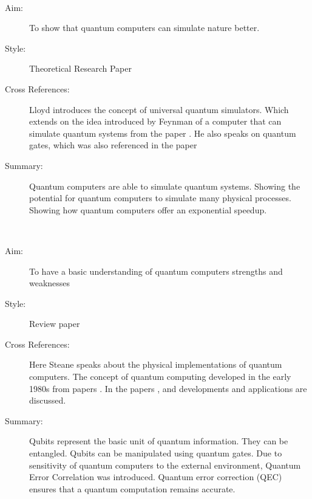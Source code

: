 \documentclass{Assignment}
\begin{document}
\newpage
\cite{UQS}~

\begin{description}
	\item[Aim:] 
	To show that quantum computers can simulate nature better.
	
	\item [Style:] Theoretical Research Paper
	
	\item [Cross References:]
	Lloyd introduces the concept of universal quantum simulators. 
	Which extends on the idea introduced by Feynman of a computer that can simulate quantum systems from the paper \cite{feynman1982simulating}. 
	He also speaks on quantum gates, which was also referenced in the paper \cite{Deutsch1989}
	
	\item[Summary:] 
	Quantum computers are able to simulate quantum systems. 
	Showing the potential for quantum computers to simulate many physical processes.	
	Showing how quantum computers offer an exponential speedup.

	
	
\end{description}
\newpage
\cite{AndrewSteane}~
\begin{description}
	\item[Aim:] 
	To have a basic understanding of quantum computers strengths and weaknesses
	
	\item [Style:] 
	Review paper
	
	\item [Cross References:] 
	Here Steane speaks about the physical implementations of quantum computers. 
	The concept of quantum computing developed in the early 1980s from papers \cite{feynman1982simulating}. 	
	In the papers \cite{PhysRevA.93.032301}, \cite{doi:10.1137/S0097539796298637} and \cite{UQS} developments and applications are discussed.
	
	\item[Summary:] 
	Qubits represent the basic unit of quantum information.
	They can be entangled.
	Qubits can be manipulated using quantum gates.
	Due to sensitivity of quantum computers to the external environment, Quantum Error Correlation was introduced.
	Quantum error correction (QEC) ensures that a quantum computation remains  accurate.
\end{description}
	 	\newpage
	 	
\end{document}
